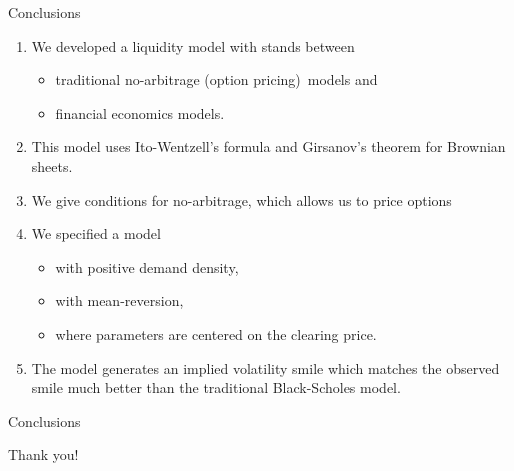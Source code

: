 \documentclass{beamer}
\begin{document}
\begin{frame}[shrink=25]{{\color{cyan}Conclusions}}
\bigskip
\begin{enumerate}
\item We developed a liquidity model with stands between
		\begin{itemize}
			\item traditional no-arbitrage (option pricing)\ models and
			\item financial economics models.
		\end{itemize}

\vspace{5pt}
\item This model uses Ito-Wentzell's formula and Girsanov's theorem for Brownian sheets.

\vspace{5pt}
\item We give conditions for no-arbitrage, which allows us to price options

\vspace{5pt}
\item We specified a model
		\begin{itemize}
			\item with positive demand density,
			\item with mean-reversion,
			\item where parameters are centered on the clearing price.
		\end{itemize}

\vspace{5pt}	
\item The model generates an implied volatility smile which matches the observed smile much better than the traditional Black-Scholes model.

\end{enumerate}
\end{frame}

\begin{frame}[shrink=25]{{\color{cyan}Conclusions}}
\bigskip

Thank you!

\end{frame}
\end{document}
